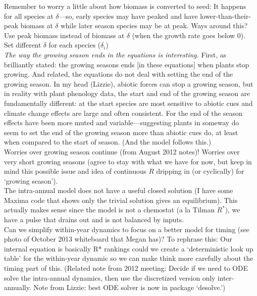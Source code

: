 \documentclass[11pt,a4paper,oneside]{article}
\begin{document}
\noindent Remember to worry a little about how biomass is converted to seed: It happens for all species at $\delta$---so, early species may have peaked and have lower-than-their-peak biomass at $\delta$ while later season species may be at peak. Ways around this?\\

\noindent Use peak biomass instead of biomass at $\delta$ (when the growth rate goes below 0). \\

\noindent Set different $\delta$ for each species ($\delta_{i}$)\\

\noindent \emph{The way the growing season ends in the equations is
interesting.} First, as brilliantly stated: the growing seasons ends
[in these equations] when plants stop growing. And related, the
equations do not deal with setting the end of the growing season. In
my head (Lizzie), abiotic forces can stop a growing season, but in
reality with plant phenology data, the start and end of the growing
season are fundamentally different: at the start species are most
sensitive to abiotic cues and climate change effects are large and
often consistent. For the end of the season effects have been more
muted and variable---suggesting plants in someway do seem to set the
end of the growing season more than abiotic cues do, at least when
compared to the start of season. (And the model follows this.)\\

Worries over growing season continue (from August 2012 notes)! Worries over very short growing seasons (agree to stay with what we have for now, but keep in mind this possible issue and idea of continuous $R$ dripping in (or cyclically) for `growing season').\\

\noindent The intra-annual model does not have a useful closed solution (I
  have some Maxima code that shows only the trivial solution gives an
  equilibrium). This actually makes sense since the model is not a
  chemostat (a la Tilman \(R^{*}\)), we have a pulse that drains out
  and is not balanced by inputs.\\

 Can we simplify within-year dynamics to focus on a better model for timing (see photo of October 2013 whiteboard that Megan has)? To rephrase this: Our internal equation is basically R* rankings could we create a `deterministic look up table' for the within-year dynamic so we can make think more carefully about the timing part of this.  (Related note from 2012 meeting: Decide if we need to ODE solve the intra-annual
  dynamics, then use the discretized version only inter-annually. Note from Lizzie: best ODE solver is now in package `desolve.')\\
\end{document}
